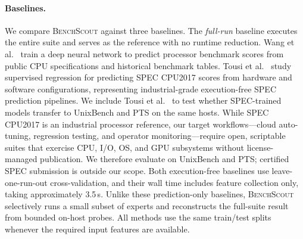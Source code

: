 \documentclass[sigplan,10pt]{acmart}
\newcommand{\ourmethod}{\textsc{BenchScout}\xspace}
\begin{document}
\paragraph{Baselines.}
We compare \ourmethod against three baselines. The \emph{full-run} baseline executes the entire suite and serves as the reference with no runtime reduction. Wang et al.~\cite{wang2019predicting} train a deep neural network to predict processor benchmark scores from public CPU specifications and historical benchmark tables. Tousi et al.~\cite{tousi2022comparative} study supervised regression for predicting SPEC CPU2017 scores from hardware and software configurations, representing industrial-grade execution-free SPEC prediction pipelines. We include Tousi et al.~\cite{tousi2022comparative} to test whether SPEC-trained models transfer to UnixBench and PTS on the same hosts. While SPEC CPU2017 is an industrial processor reference, our target workflows---cloud auto-tuning, regression testing, and operator monitoring---require open, scriptable suites that exercise CPU, I/O, OS, and GPU subsystems without license-managed publication. We therefore evaluate on UnixBench and PTS; certified SPEC submission is outside our scope. Both execution-free baselines use leave-one-run-out cross-validation, and their wall time includes feature collection only, taking approximately 3.5\,s. Unlike these prediction-only baselines, \ourmethod selectively runs a small subset of experts and reconstructs the full-suite result from bounded on-host probes. All methods use the same train/test splits whenever the required input features are available.
\end{document}
